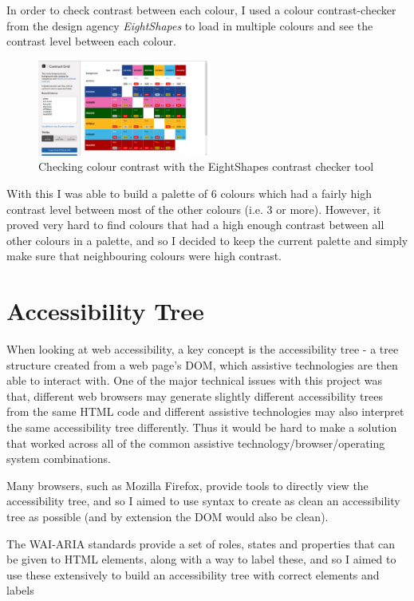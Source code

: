 \documentclass[ %
                    author={Aleena Baig},
                supervisor={Dr Simon Lock},
                    degree={BSc},
                     title={On Making Web Accessible Graphs},
                  subtitle={},
                      year={2019} ]{dissertation}
\begin{document}
In order to check contrast between each colour, I used a colour contrast-checker from the design agency \textit{EightShapes} to load in multiple colours and see the contrast level between each colour.

\begin{figure}[h]
\caption{Checking colour contrast with the EightShapes contrast checker tool}
\centering
\includegraphics[width=0.5\textwidth]{images/EightShapeColourChecker.png}
\end{figure}

With this I was able to build a palette of 6 colours which had a fairly high contrast level between most of the other colours (i.e. 3 or more). However, it proved very hard to find colours that had a high enough contrast between all other colours in a palette, and so I decided to keep the current palette and simply make sure that neighbouring colours were high contrast.

\section{Accessibility Tree}

When looking at web accessibility, a key concept is the accessibility tree - a tree structure created from a web page's DOM, which assistive technologies are then able to interact with. One of the major technical issues with this project was that, different web browsers may generate slightly different accessibility trees from the same HTML code and different assistive technologies may also interpret the same accessibility tree differently. Thus it would be hard to make a solution that worked across all of the common assistive technology/browser/operating system combinations.


Many browsers, such as Mozilla Firefox, provide tools to directly view the accessibility tree, and so I aimed to use syntax to create as clean an accessibility tree as possible (and by extension the DOM would also be clean).

The WAI-ARIA standards provide a set of roles, states and properties that can be given to HTML elements, along with a way to label these, and so I aimed to use these extensively to build an accessibility tree with correct elements and labels
\end{document}

